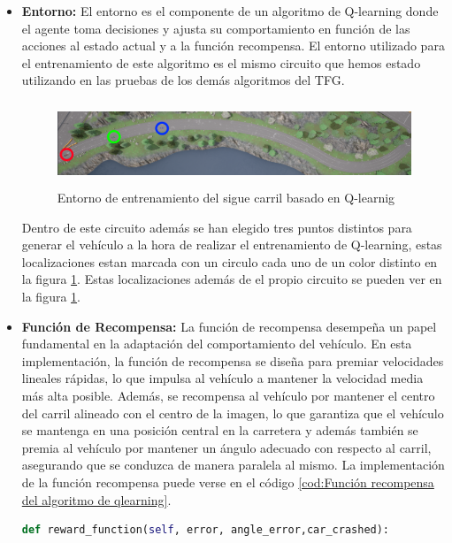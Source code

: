 \begin{itemize}
    
    \item \textbf{Entorno:} El entorno es el componente de un algoritmo de Q-learning donde el agente toma decisiones y ajusta su comportamiento en función de las acciones al estado actual y a la función recompensa. El entorno utilizado para el entrenamiento de este algoritmo es el mismo circuito que hemos estado utilizando en las pruebas de los demás algoritmos del \ac{TFG}.
    \begin{figure}[H]
    \hspace{1cm}
    \includegraphics[height=2.5cm]{imagenes/cap4/entorno_qlearnig.png}
    \caption{Entorno de entrenamiento del sigue carril basado en Q-learnig}
    \label{fig:Entorno de entrenamiento del algoritmo de Q-learnig}
    \end{figure}
    
     Dentro de este circuito además se han elegido tres puntos distintos para generar el vehículo a la hora de realizar el entrenamiento de Q-learning, estas localizaciones estan marcada con un circulo cada uno de un color distinto en la figura \ref{fig:Entorno de entrenamiento del algoritmo de Q-learnig}. Estas localizaciones además de el propio circuito se pueden ver en la figura \ref{fig:Entorno de entrenamiento del algoritmo de Q-learnig}.
    
    \bigskip    
    \item \textbf{Función de Recompensa:} La función de recompensa desempeña un papel fundamental en la adaptación del comportamiento del vehículo. En esta implementación, la función de recompensa se diseña para premiar velocidades lineales rápidas, lo que impulsa al vehículo a mantener la velocidad media más alta posible. Además, se recompensa al vehículo por mantener el centro del carril alineado con el centro de la imagen, lo que garantiza que el vehículo se mantenga en una posición central en la carretera y además también se premia al vehículo por mantener un ángulo adecuado con respecto al carril, asegurando que se conduzca de manera paralela al mismo. La implementación de la función recompensa puede verse en el código \ref{cod:Función recompensa del algoritmo de qlearning}.
   
    \bigskip
\begin{code}[H]
	\begin{lstlisting}[language=Python]	
    def reward_function(self, error, angle_error,car_crashed):


\end{lstlisting}
\end{code}
\end{itemize}
